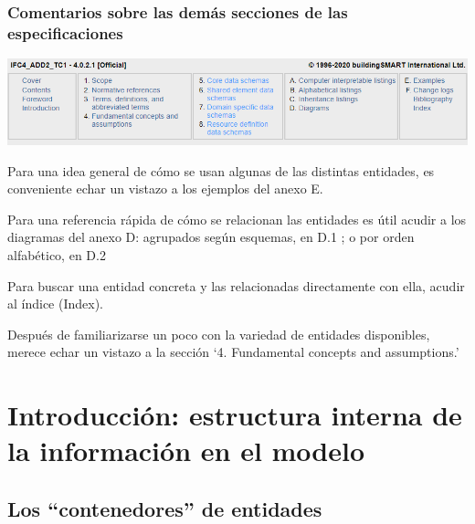 \documentclass[spanish,12pt,a4paper,final,oneside]{book}
\begin{document}
\begin{minipage}{\textwidth}

\subsection{Comentarios sobre las demás secciones de las especificaciones}
\includegraphics[width=\textwidth]{cabecera de las especificaciones}

\vspace{0.5cm}

Para una idea general de cómo se usan algunas de las distintas entidades, es conveniente echar un vistazo a los ejemplos del anexo E.

\vspace{0.5cm}

Para una referencia rápida de cómo se relacionan las entidades es útil acudir a los diagramas del anexo D: agrupados según esquemas, en D.1 ; o por orden alfabético, en D.2

\vspace{0.5cm}

Para buscar una entidad concreta y las relacionadas directamente con ella, acudir al índice (Index).

\vspace{0.5cm}

Después de familiarizarse un poco con la variedad de entidades disponibles, merece echar un vistazo a la sección `4. Fundamental concepts and assumptions.'

\end{minipage}



\chapter{Introducción: estructura interna de la información en el modelo}


\section{Los ``\textbf{contenedores}'' de entidades}
\end{document}
